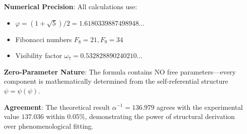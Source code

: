 \documentclass[%
 reprint,
 amsmath,amssymb,
 aps,
 prd,
 10pt,
 nofootinbib,      %
 longbibliography  %
]{revtex4-2}
\theoremstyle{definition}
\theoremstyle{remark}
\begin{document}
\textbf{Numerical Precision}: All calculations use:
\begin{itemize}
\item $\varphi = (1+\sqrt{5})/2 = 1.6180339887498948...$
\item Fibonacci numbers $F_8 = 21, F_9 = 34$  
\item Visibility factor $\omega_7 = 0.532828890240210...$
\end{itemize}

\textbf{Zero-Parameter Nature}: The formula contains NO free parameters---every component
is mathematically determined from the self-referential structure $\psi = \psi(\psi)$.

\textbf{Agreement}: The theoretical result $\alpha^{-1} = 136.979$ agrees with
the experimental value $137.036$ within 0.05\%, demonstrating the power of
structural derivation over phenomenological fitting.
\end{document}
